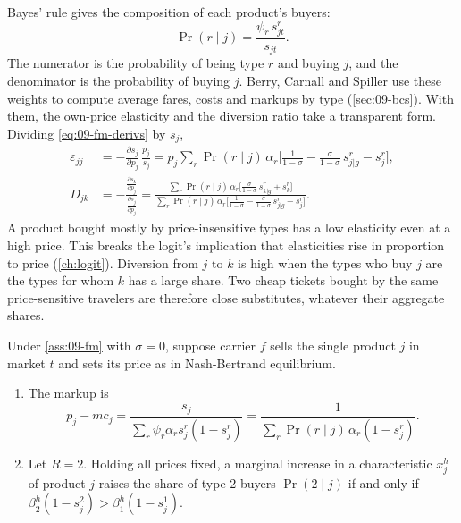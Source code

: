 Bayes' rule gives the composition of each product's buyers:
\begin{equation}\label{eq:09-composition}
\Pr(r\mid j)=\frac{\psi_r\,s^r_{jt}}{s_{jt}} .
\end{equation}
The numerator is the probability of being type $r$ and buying $j$, and the denominator is the
probability of buying $j$. Berry, Carnall and Spiller use these weights to compute average fares,
costs and markups by type (\cref{sec:09-bcs}). With them, the own-price elasticity and the diversion
ratio take a transparent form. Dividing \eqref{eq:09-fm-derivs} by $s_j$,
\begin{align*}
\varepsilon_{jj}&=-\frac{\partial s_j}{\partial p_j}\,\frac{p_j}{s_j}
=p_j\sum_r\Pr(r\mid j)\,\alpha_r\Big[\frac{1}{1-\sigma}-\frac{\sigma}{1-\sigma}\,s^r_{j|g}-s^r_j\Big],\\
D_{jk}&=-\frac{\frac{\partial s_k}{\partial p_j}}{\frac{\partial s_j}{\partial p_j}}
=\frac{\sum_r\Pr(r\mid j)\,\alpha_r\Big[\frac{\sigma}{1-\sigma}\,s^r_{k|g}+s^r_k\Big]}
{\sum_r\Pr(r\mid j)\,\alpha_r\Big[\frac{1}{1-\sigma}-\frac{\sigma}{1-\sigma}\,s^r_{j|g}-s^r_j\Big]} .
\end{align*}
A product bought mostly by price-insensitive types has a low elasticity even at a high price. This breaks
the logit's implication that elasticities rise in proportion to price (\cref{ch:logit}). Diversion from
$j$ to $k$ is high when the types who buy $j$ are the types for whom $k$ has a large share. Two cheap
tickets bought by the same price-sensitive travelers are therefore close substitutes, whatever their
aggregate shares.

\begin{proposition}\label{prop:09-composition-markup}
Under \cref{ass:09-fm} with $\sigma=0$, suppose carrier $f$ sells the single product $j$ in market $t$
and sets its price as in Nash-Bertrand equilibrium.
\begin{enumerate}[label=(\alph*)]
\item The markup is
\begin{equation*}
p_j-mc_j=\frac{s_j}{\sum_r\psi_r\alpha_rs^r_j(1-s^r_j)}=\frac{1}{\sum_r\Pr(r\mid j)\,\alpha_r(1-s^r_j)} .
\end{equation*}
\item Let $R=2$. Holding all prices fixed, a marginal increase in a characteristic $x^h_j$ of product $j$
raises the share of type-2 buyers $\Pr(2\mid j)$ if and only if
$\beta^h_2(1-s^2_j)>\beta^h_1(1-s^1_j)$.
\end{enumerate}
\end{proposition}

